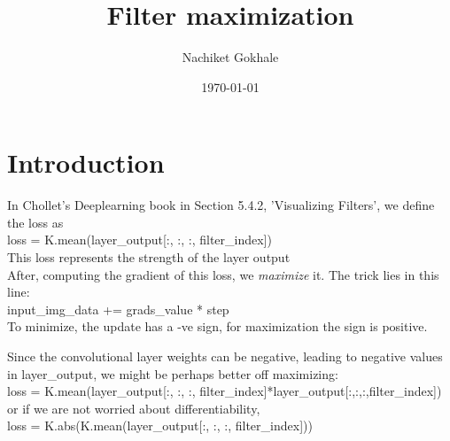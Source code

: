 \documentclass{article}
\begin{document}
\title{Filter maximization}
\author{Nachiket Gokhale}
\date{\today}
\maketitle
\section{Introduction}
In Chollet's Deeplearning book in Section 5.4.2, 'Visualizing Filters', we define the loss as \\

loss = K.mean(layer\_output[:, :, :, filter\_index]) \\

This loss represents the strength of the layer output \\

After, computing the gradient of this loss, we \textit{maximize} it. The trick lies in this line:\\

input\_img\_data += grads\_value * step\\

To minimize, the update has a -ve sign, for maximization the sign is positive.

Since the convolutional layer weights can be negative, leading to negative values in layer\_output, we might be perhaps better off maximizing:\\

loss = K.mean(layer\_output[:, :, :, filter\_index]*layer\_output[:,:,:,filter\_index]) \\

or if we are not worried about differentiability, \\

loss = K.abs(K.mean(layer\_output[:, :, :, filter\_index]))
\end{document}
